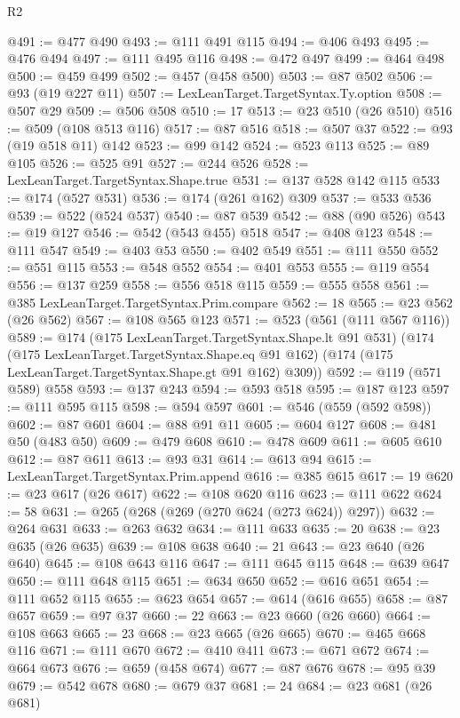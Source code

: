 \begin{lexlean}{R2}
\begin{coremodule}
@491 := @477 @490
@493 := @111 @491 @115
@494 := @406 @493
@495 := @476 @494
@497 := @111 @495 @116
@498 := @472 @497
@499 := @464 @498
@500 := @459 @499
@502 := @457 (@458 @500)
@503 := @87 @502
@506 := @93 (@19 @227 @11)
@507 := LexLeanTarget.TargetSyntax.Ty.option
@508 := @507 @29
@509 := @506 @508
@510 := 17
@513 := @23 @510 (@26 @510)
@516 := @509 (@108 @513 @116)
@517 := @87 @516
@518 := @507 @37
@522 := @93 (@19 @518 @11) @142
@523 := @99 @142
@524 := @523 @113
@525 := @89 @105
@526 := @525 @91
@527 := @244 @526
@528 := LexLeanTarget.TargetSyntax.Shape.true
@531 := @137 @528 @142 @115
@533 := @174 (@527 @531)
@536 := @174 (@261 @162) @309
@537 := @533 @536
@539 := @522 (@524 @537)
@540 := @87 @539
@542 := @88 (@90 @526)
@543 := @19 @127
@546 := @542 (@543 @455) @518
@547 := @408 @123
@548 := @111 @547
@549 := @403 @53
@550 := @402 @549
@551 := @111 @550
@552 := @551 @115
@553 := @548 @552
@554 := @401 @553
@555 := @119 @554
@556 := @137 @259
@558 := @556 @518 @115
@559 := @555 @558
@561 := @385 LexLeanTarget.TargetSyntax.Prim.compare
@562 := 18
@565 := @23 @562 (@26 @562)
@567 := @108 @565 @123
@571 := @523 (@561 (@111 @567 @116))
@589 := @174
    (@175 LexLeanTarget.TargetSyntax.Shape.lt @91 @531)
    (@174
      (@175 LexLeanTarget.TargetSyntax.Shape.eq @91 @162)
      (@174 (@175 LexLeanTarget.TargetSyntax.Shape.gt @91 @162) @309))
@592 := @119 (@571 @589) @558
@593 := @137 @243
@594 := @593 @518
@595 := @187 @123
@597 := @111 @595 @115
@598 := @594 @597
@601 := @546 (@559 (@592 @598))
@602 := @87 @601
@604 := @88 @91 @11
@605 := @604 @127
@608 := @481 @50 (@483 @50)
@609 := @479 @608
@610 := @478 @609
@611 := @605 @610
@612 := @87 @611
@613 := @93 @31
@614 := @613 @94
@615 := LexLeanTarget.TargetSyntax.Prim.append
@616 := @385 @615
@617 := 19
@620 := @23 @617 (@26 @617)
@622 := @108 @620 @116
@623 := @111 @622
@624 := 58
@631 := @265 (@268 (@269 (@270 @624 (@273 @624)) @297))
@632 := @264 @631
@633 := @263 @632
@634 := @111 @633
@635 := 20
@638 := @23 @635 (@26 @635)
@639 := @108 @638
@640 := 21
@643 := @23 @640 (@26 @640)
@645 := @108 @643 @116
@647 := @111 @645 @115
@648 := @639 @647
@650 := @111 @648 @115
@651 := @634 @650
@652 := @616 @651
@654 := @111 @652 @115
@655 := @623 @654
@657 := @614 (@616 @655)
@658 := @87 @657
@659 := @97 @37
@660 := 22
@663 := @23 @660 (@26 @660)
@664 := @108 @663
@665 := 23
@668 := @23 @665 (@26 @665)
@670 := @465 @668 @116
@671 := @111 @670
@672 := @410 @411
@673 := @671 @672
@674 := @664 @673
@676 := @659 (@458 @674)
@677 := @87 @676
@678 := @95 @39
@679 := @542 @678
@680 := @679 @37
@681 := 24
@684 := @23 @681 (@26 @681)

\end{coremodule}
\end{lexlean}
